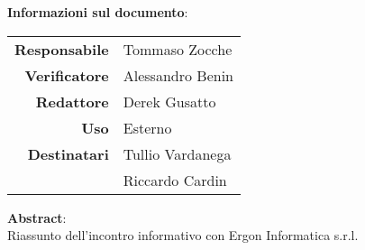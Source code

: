 \begin{center}
\textbf{Informazioni sul documento}: \\
\vspace{0.5cm}

\begin{tabular}{r|l}
    \textbf{Responsabile} & Tommaso Zocche \\ 
    \textbf{Verificatore} & Alessandro Benin \\ 
    \textbf{Redattore} &     Derek Gusatto\\ 
    \textbf{Uso} & Esterno \\ 
    \textbf{Destinatari} & Tullio Vardanega \\ & Riccardo Cardin \\ 
\end{tabular}

\vfill

\textbf{Abstract}: \\
\vspace{0.5cm}
Riassunto dell'incontro informativo con Ergon Informatica s.r.l.

\end{center}


\bigskip
